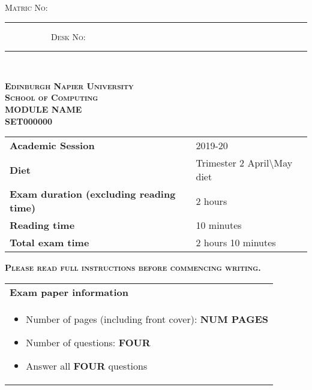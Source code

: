 \documentclass[12pt, a4paper, twosize]{article}
\newcommand*{\inputline}[1][3em]{\rule[0.5ex]{#1}{0.55pt}}
\begin{document}
\begin{titlepage}
\vspace*{1cm}

\textsc{Matric No:} \inputline[10em] \ \ \ \ \ \ \ \ \ \ \ \textsc{Desk No:} \inputline[10em]

\ 

\noindent \textsc{\Large {\bf{Edinburgh Napier University}}}\\[0.5cm]
\textsc{\Large {\bf{School of Computing}}}\\[1.5cm]


\noindent \textsc{\Large {\bf{MODULE NAME}}}\\[1cm]
\textsc{\Large {\bf{SET000000}}}\\[1.5cm]

\vspace{-1cm}

\begin{table}[H]
\centering
\begin{tabular}{ll}
\textbf{Academic Session}                           & 2019-20 \\ 
 \textbf{Diet}                                      & Trimester 2 April\textbackslash May diet  \\
\textbf{Exam duration (excluding reading time)}     & 2 hours\\
 \textbf{Reading time}                              & 10 minutes \\
 \textbf{Total exam time}                           & 2 hours 10 minutes
\end{tabular}
\end{table}

\vspace{1cm}
\noindent\textsc{{\bf{Please read full instructions before commencing writing.}}}

\begin{table}[H]
\centering
\begin{tabular}{p{14cm}}


{\bf{Exam paper information}}\\

    \begin{itemize}
      \item Number of pages (including front cover): {\bf{NUM PAGES}}
      \item Number of questions: {\bf{FOUR}}
      \item Answer all {\bf{FOUR}} questions
    \end{itemize} \\



\end{tabular}
\end{table}
\end{titlepage}
\end{document}
